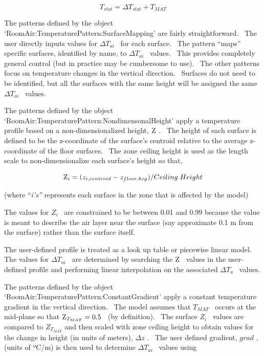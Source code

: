 \begin{equation}
{T_{stat}} = \Delta {T_{stat}} + {T_{MAT}}
\end{equation}

The patterns defined by the object `RoomAir:TemperaturePattern:SurfaceMapping' are fairly straightforward.~ The user directly inputs values for \(\Delta {T_{ai}}\) ~for each surface.~ The pattern ``maps'' specific surfaces, identified by name, to \(\Delta {T_{ai}}\) ~values.~ This provides completely general control (but in practice may be cumbersome to use).~ The other patterns focus on temperature changes in the vertical direction.~ Surfaces do not need to be identified, but all the surfaces with the same height will be assigned the same \(\Delta {T_{ai}}\) ~values.

The patterns defined by the object `RoomAir:TemperaturePattern:NondimensonalHeight' apply a temperature profile based on a non-dimensionalized height, \({\rm Z}\) .~ The height of each surface is defined to be the z-coordinate of the surface's centroid relative to the average z-coordinate of the floor surfaces.~ The zone ceiling height is used as the length scale to non-dimensionalize each surface's height so that,

\begin{equation}
{{\rm Z}_i} = ({z_{i,centroid}} - {z_{floorAvg}})/Ceiling\;Height
\end{equation}

(where ``\emph{i's''} represents each surface in the zone that is affected by the model)

The values for \({Z_i}\) ~are constrained to be between 0.01 and 0.99 because the value is meant to describe the air layer near the surface (say approximate 0.1 m from the surface) rather than the surface itself.

The user-defined profile is treated as a look up table or piecewise linear model.~ The values for \(\Delta {T_{ai}}\) ~are determined by searching the \({\rm Z}\) ~values in the user-defined profile and performing linear interpolation on the associated \(\Delta {T_a}\) ~values.

The patterns defined by the object `RoomAir:TemperaturePattern:ConstantGradient' apply a constant temperature gradient in the vertical direction.~ The model assumes that \({T_{MAT}}\) ~occurs at the mid-plane so that \({{\rm Z}_{{T_{MAT}}}} = 0.5\) ~(by definition).~ The surface \({Z_i}\) ~values are compared to \({Z_{{T_{MAT}}}}\) and then scaled with zone ceiling height to obtain values for the change in height (in units of meters), \(\Delta z\) .~ The user defined gradient, \(grad\) , (units of ºC/m) is then used to determine \(\Delta {T_{ai}}\) ~values using

